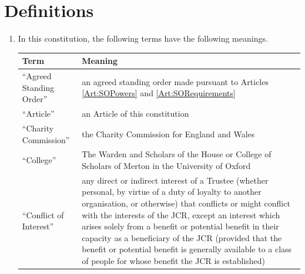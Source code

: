 \documentclass[11pt,a4paper, oneside]{memoir}
\begin{document}
	\section{Definitions} \label{Art:Definitions}
	\begin{enumerate}
		\item In this constitution, the following terms have the following meanings.
		\begin{longtable}{|p{}|p{}|}
			\hline
			Term                            & Meaning
			\\ \hline \endhead
			``Agreed Standing Order''         & an agreed standing order made pursuant to Articles \ref{Art:SOPowers} and \ref{Art:SORequirements}  
			\\ \hline
			``Article''                       & an Article of this constitution                                                  \\ \hline
			``Charity Commission''            & the Charity Commission for England and Wales                                                                                                                                                                                                                                                                                                                                                                                                                         \\ \hline
			``College''                       & The Warden and Scholars of the House or College of Scholars of Merton in the University of Oxford                                                                                                                                                                                                                                                                                                                                                                                \\ \hline
			``Conflict of Interest''          & any direct or indirect interest of a Trustee (whether personal, by virtue of a duty of loyalty to another organisation, or otherwise) that conflicts or might conflict with the interests of the JCR, except an interest which arises solely from a benefit or potential benefit in their capacity as a beneficiary of the JCR (provided that the benefit or potential benefit is generally available to a class of people for whose benefit the JCR is established) \\ \hline

\end{longtable}
\end{enumerate}
\end{document}
